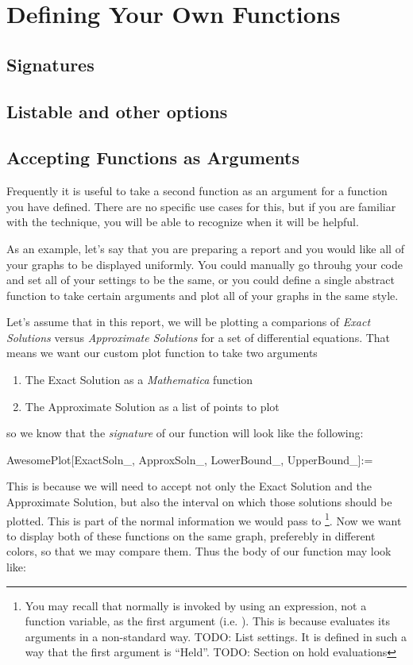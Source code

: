 \chapter{Defining Your Own Functions}
\label{chap:Functions}

\section{Signatures}

\section{Listable and other options}

\section{Accepting Functions as Arguments}

Frequently it is useful to take a second function as an argument for a function you have defined. There are no specific use cases for this, but if you are familiar with the technique, you will be able to recognize when it will be helpful.

As an example, let's say that you are preparing a report and you would like all of your graphs to be displayed uniformly. You could manually go throuhg your code and set all of your  settings to be the same, or you could define a single abstract function to take certain arguments and plot all of your graphs in the same style.

Let's assume that in this report, we will be plotting a comparions of \emph{Exact Solutions} versus \emph{Approximate Solutions} for a set of differential equations. That means we want our custom plot function to take two arguments
\begin{enumerate}
	   \item The Exact Solution as a \emph{Mathematica} function
	   \item The Approximate Solution as a list of points to plot
\end{enumerate}
so we know that the \emph{signature} of our function will look like the following:
\begin{code}
	   AwesomePlot[ExactSoln\_, ApproxSoln\_, LowerBound\_, UpperBound\_]:=
\end{code}

This is because we will need to accept not only the Exact Solution and the Approximate Solution, but also the interval on which those solutions should be plotted. This is part of the normal information we would pass to \footnote{You may recall that normally  is invoked by using an expression, not a function variable, as the first argument (i.e. ). This is because  evaluates its arguments in a non-standard way. TODO: List settings. It is defined in such a way that the first argument is ``Held''. TODO: Section on hold evaluations}. Now we want to display both of these functions on the same graph, preferebly in different colors, so that we may compare them. Thus the body of our function may look like:

